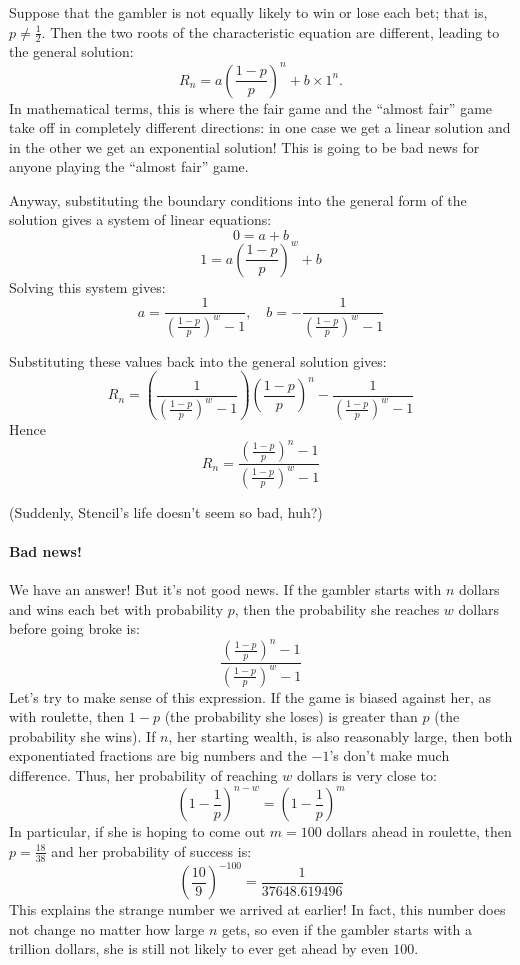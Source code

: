 \documentclass[12pt,a4paper]{article}
\begin{document}
		Suppose that the gambler is not equally likely to win or lose each bet; that is, $p \neq \frac{1}{2}$. Then the two roots of the characteristic equation are different, leading to the general solution:
		$$
		R_n = a \left( \frac{1 - p}{p} \right)^n + b\times 1^n.
		$$
		In mathematical terms, this is where the fair game and the ``almost fair'' game take off in completely different directions: in one case we get a linear solution and in the other we get an exponential solution! This is going to be bad news for anyone playing the ``almost fair'' game.
		
		Anyway, substituting the boundary conditions into the general form of the solution gives a system of linear equations:
		$$
		0 = a + b
		$$
		$$
		1 = a \left(\frac{1-p}{p} \right)^w + b
		$$
		Solving this system gives:
		$$
		a = \frac{1}{\left( \frac{1-p}{p} \right)^w - 1}, \quad b =- \frac{1}{\left(\frac{1-p}{p} \right)^w - 1}
		$$
		
		Substituting these values back into the general solution gives:
		$$
		R_n = \left(\frac{1}{\left( \frac{1-p}{p} \right)^w - 1}\right) \left( \frac{1-p}{p} \right)^n 
		- \frac{1}{\left( \frac{1-p}{p} \right)^w-1}
		$$
		Hence
		$$
		R_n = \frac{\left( \frac{1-p}{p} \right)^n-1}{\left(\frac{1-p}{p} \right)^w-1}
		$$
		
		(Suddenly, Stencil's life doesn't seem so bad, huh?)
		\paragraph{Bad news!}
		We have an answer! But it's not good news. If the gambler starts with $n$ dollars and wins each bet with probability $p$, then the probability she reaches $w$ dollars before going broke is:
		$$
		\frac{\left( \frac{1-p}{p} \right)^n-1}{\left(\frac{1-p}{p} \right)^w-1}
		$$
		Let's try to make sense of this expression. If the game is biased against her, as with roulette, then $1 - p$ (the probability she loses) is greater than $p$ (the probability she wins). If $n$, her starting wealth, is also reasonably large, then both exponentiated fractions are big numbers and the $-1$'s don't make much difference. Thus, her probability of reaching $w$ dollars is very close to:
		$$
		\left( 1 - \frac{1}{p} \right)^{n-w} = \left( 1 - \frac{1}{p} \right)^m
		$$
		In particular, if she is hoping to come out $m = 100$ dollars ahead in roulette, then $p = \frac{18}{38}$ and her probability of success is:
		$$
		\left( \frac{10}{9} \right)^{-100} = \frac{1}{37648.619496}
		$$
		This explains the strange number we arrived at earlier! In fact, this number does not change no matter how large $n$ gets, so even if the gambler starts with a trillion dollars, she is still not likely to ever get ahead by even $100$.
		
\end{document}
